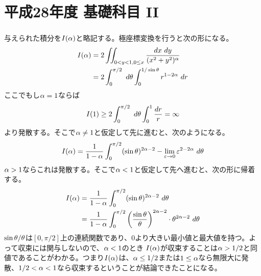 \section{平成28年度 基礎科目 II}

\subsubsection{} %
\begin{sol}
与えられた積分を$I({\alpha})$と略記する。極座標変換を行うと次の形になる。
\begin{align*}
  I({\alpha}) &= 2 \iint_{0 < y < 1, 0 \leq x} \frac{dx \ dy}{(x^2 + y^2)^{{\alpha}} } \\
  &= 2 \int_0^{\pi /2} \ d{\theta} \int_0^{1/ \sin {\theta}} r^{1 - 2 {\alpha}} \ dr
\end{align*}
ここでもし${\alpha} = 1$ならば
\[
I(1) \geq 2 \int_0^{\pi /2} \ d{\theta} \int_0^1 \frac{dr}{r} = \infty
\]
より発散する。そこで${\alpha} \neq 1$と仮定して先に進むと、次のようになる。
\[
I({\alpha}) = \frac{1}{1- {\alpha}} \int_0^{\pi /2} (\sin {\theta})^{2{\alpha} - 2} - \lim_{{\varepsilon} \to 0} {\varepsilon}^{2 - 2{\alpha}} \ d{\theta}
\]
${\alpha} > 1$ならこれは発散する。そこで${\alpha} < 1$と仮定して先へ進むと、次の形に帰着する。
\begin{align*}
  I({\alpha}) &=  \frac{1}{1- {\alpha}} \int_0^{\pi /2}  (\sin {\theta})^{2{\alpha} - 2} \ d{\theta} \\
  &= \frac{1}{1- {\alpha}} \int_0^{\pi /2}  \left( \frac{\sin {\theta}}{{\theta}} \right)^{2{\alpha} - 2} \cdot {\theta}^{2{\alpha} - 2} \ d{\theta} 
\end{align*}
$\sin {\theta} / {\theta}$は$[0, \pi/2]$上の連続関数であり、$0$より大きい最小値と最大値を持つ。よって収束には関与しないので、${\alpha} < 1$のとき
$I({\alpha})$が収束することは${\alpha} > 1/2$と同値であることがわかる。つまり$I({\alpha})$は、${\alpha} \leq 1/2$または$1 \leq {\alpha}$なら無限大に発散、$1/2 < {\alpha} < 1$なら収束するということが結論できたことになる。
\end{sol}

\newpage


